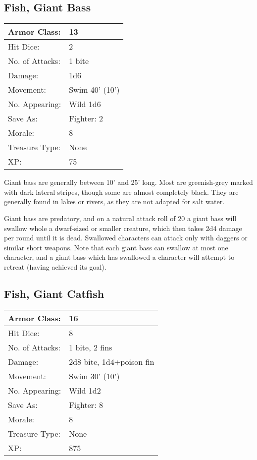 \documentclass[a4paper,twoside,openany,10pt]{book}
\begin{document}
\begin{multicols}{2}
\subsection*{Fish, Giant Bass}\label{fish-giant-bass}

\begin{tabularx}{0.48\textwidth}{@{}lX@{}}
Armor Class: & 13 \\\hline
Hit Dice: & 2 \\\hline
No. of Attacks: & 1 bite \\\hline
Damage: & 1d6 \\\hline
Movement: & Swim 40' (10') \\\hline
No. Appearing: & Wild 1d6 \\\hline
Save As: & Fighter: 2 \\\hline
Morale: & 8 \\\hline
Treasure Type: & None \\\hline
XP: & 75 \\\hline
\end{tabularx}\medskip

Giant bass are generally between 10' and 25' long. Most are greenish-grey marked with dark lateral stripes, though some are almost completely black. They are generally found in lakes or rivers, as they are not adapted for salt water.

Giant bass are predatory, and on a natural attack roll of 20 a giant bass will swallow whole a dwarf-sized or smaller creature, which then takes 2d4 damage per round until it is dead. Swallowed characters can attack only with daggers or similar short weapons. Note that each giant bass can swallow at most one character, and a giant bass which has swallowed a character will attempt to retreat (having achieved its goal).

\subsection*{Fish, Giant Catfish}\label{fish-giant-catfish}

\begin{tabularx}{0.48\textwidth}{@{}lX@{}}
Armor Class: & 16 \\\hline
Hit Dice: & 8 \\\hline
No. of Attacks: & 1 bite, 2 fins \\\hline
Damage: & 2d8 bite, 1d4+poison fin \\\hline
Movement: & Swim 30' (10') \\\hline
No. Appearing: & Wild 1d2 \\\hline
Save As: & Fighter: 8 \\\hline
Morale: & 8 \\\hline
Treasure Type: & None \\\hline
XP: & 875 \\\hline
\end{tabularx}\medskip


\end{multicols}
\end{document}
